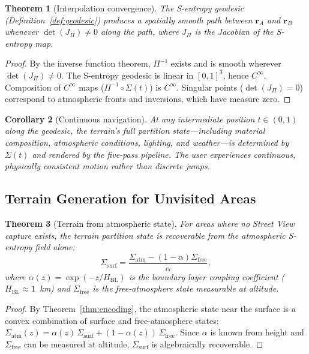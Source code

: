 \documentclass[10pt,twocolumn]{article}
\newtheorem{theorem}{Theorem}[section]
\newtheorem{corollary}[theorem]{Corollary}
\theoremstyle{definition}
\theoremstyle{remark}
\begin{document}
\begin{theorem}[Interpolation convergence]
\label{thm:interp}
The S-entropy geodesic
(Definition~\ref{def:geodesic}) produces a spatially smooth
path between $\mathbf{r}_A$ and $\mathbf{r}_B$ whenever
$\det(J_\Pi)\ne 0$ along the path, where $J_\Pi$ is the
Jacobian of the S-entropy map.
\end{theorem}

\begin{proof}
By the inverse function theorem, $\Pi^{-1}$ exists and is
smooth wherever $\det(J_\Pi)\ne 0$.  The S-entropy geodesic
is linear in $[0,1]^3$, hence $C^\infty$.  Composition of
$C^\infty$ maps ($\Pi^{-1}\circ\Sigma(t)$) is $C^\infty$.
Singular points ($\det(J_\Pi)=0$) correspond to atmospheric
fronts and inversions, which have measure zero.
\end{proof}

\begin{corollary}[Continuous navigation]
\label{cor:navigation}
At any intermediate position $t\in(0,1)$ along the geodesic,
the terrain's full partition state---including material
composition, atmospheric conditions, lighting, and weather---is
determined by $\Sigma(t)$ and rendered by the five-pass
pipeline.  The user experiences continuous, physically
consistent motion rather than discrete jumps.
\end{corollary}

\subsection{Terrain Generation for Unvisited Areas}
\label{sec:unvisited}

\begin{theorem}[Terrain from atmospheric state]
\label{thm:unvisited}
For areas where no Street View capture exists, the terrain
partition state is recoverable from the atmospheric S-entropy
field alone:
\begin{equation}\label{eq:surf_from_atm}
  \Sigma_{\mathrm{surf}}
  = \frac{\Sigma_{\mathrm{atm}}
    -(1-\alpha)\Sigma_{\mathrm{free}}}{\alpha},
\end{equation}
where $\alpha(z)=\exp(-z/H_{\mathrm{BL}})$ is the boundary
layer coupling coefficient ($H_{\mathrm{BL}}\approx 1$~km)
and $\Sigma_{\mathrm{free}}$ is the free-atmosphere state
measurable at altitude.
\end{theorem}

\begin{proof}
By Theorem~\ref{thm:encoding}, the atmospheric state near the
surface is a convex combination of surface and free-atmosphere
states: $\Sigma_{\mathrm{atm}}(z) = \alpha(z)\,
\Sigma_{\mathrm{surf}} + (1-\alpha(z))\,
\Sigma_{\mathrm{free}}$.  Since $\alpha$ is known from height
and $\Sigma_{\mathrm{free}}$ can be measured at altitude,
$\Sigma_{\mathrm{surf}}$ is algebraically recoverable.
\end{proof}
\end{document}
